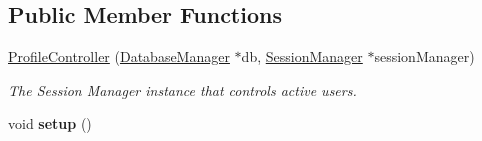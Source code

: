\subsection*{Public Member Functions}
\begin{DoxyCompactItemize}
\item 
\hyperlink{classProfileController_aa537bb3381c8e2ec6752bebdbffd9b3a}{Profile\+Controller} (\hyperlink{classDatabaseManager}{Database\+Manager} $\ast$db, \hyperlink{classSessionManager}{Session\+Manager} $\ast$session\+Manager)\hypertarget{classProfileController_aa537bb3381c8e2ec6752bebdbffd9b3a}{}\label{classProfileController_aa537bb3381c8e2ec6752bebdbffd9b3a}

\begin{DoxyCompactList}\small\item\em The Session Manager instance that controls active users. \end{DoxyCompactList}\item 
void {\bfseries setup} ()\hypertarget{classProfileController_a6185e67ac2ef5d321f867b578e3cae4f}{}\label{classProfileController_a6185e67ac2ef5d321f867b578e3cae4f}


\end{DoxyCompactItemize}
